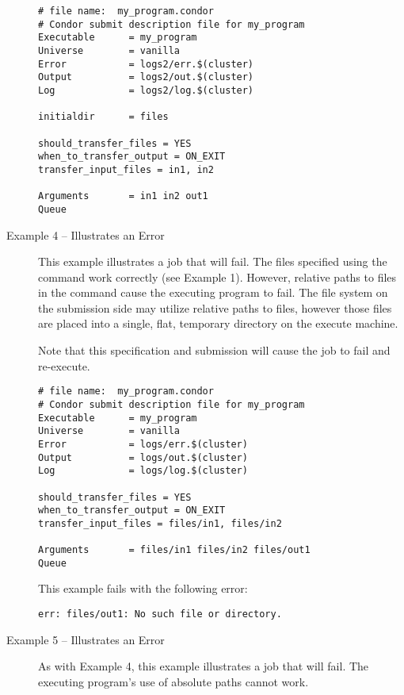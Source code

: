 \begin{description}
\footnotesize
\begin{verbatim}
# file name:  my_program.condor
# Condor submit description file for my_program
Executable      = my_program
Universe        = vanilla
Error           = logs2/err.$(cluster)
Output          = logs2/out.$(cluster)
Log             = logs2/log.$(cluster)

initialdir      = files

should_transfer_files = YES
when_to_transfer_output = ON_EXIT
transfer_input_files = in1, in2

Arguments       = in1 in2 out1
Queue
\end{verbatim}
\normalsize

\item[Example 4 -- Illustrates an Error]

This example illustrates a job that will fail.
The files specified using the
 command work
correctly (see Example 1).
However,
relative paths to files in the
 command
cause the executing program to fail.
The file system on the submission side may utilize
relative paths to files,
however those files are placed into a single,
flat, temporary directory on the execute machine.

Note that this specification and submission will cause the
job to fail and re-execute.

\footnotesize
\begin{verbatim}
# file name:  my_program.condor
# Condor submit description file for my_program
Executable      = my_program
Universe        = vanilla
Error           = logs/err.$(cluster)
Output          = logs/out.$(cluster)
Log             = logs/log.$(cluster)

should_transfer_files = YES
when_to_transfer_output = ON_EXIT
transfer_input_files = files/in1, files/in2

Arguments       = files/in1 files/in2 files/out1
Queue
\end{verbatim}
\normalsize

This example fails with the following error:
\footnotesize
\begin{verbatim}
err: files/out1: No such file or directory.
\end{verbatim}
\normalsize

\item[Example 5 -- Illustrates an Error]

As with Example 4,
this example illustrates a job that will fail.
The executing program's use of 
absolute paths cannot work.


\end{description}
